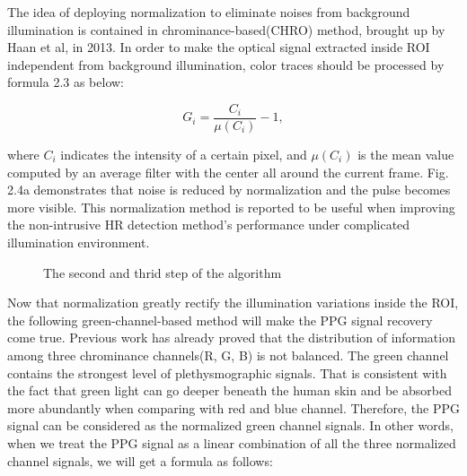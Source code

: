 The idea of deploying normalization to eliminate noises from background illumination is contained in chrominance-based(CHRO) method, brought up by Haan et al\cite{de2013robust}, in 2013. In order to make the optical signal extracted inside ROI independent from background illumination, color traces should be processed by formula 2.3 as below:


      \begin{equation}
        G_i = \frac{C_i}{\mu(C_i)}-1,
    \end{equation} 

where $C_i$ indicates the intensity of a certain pixel, and $\mu(C_i)$ is the mean value computed by an average filter with the center all around the current frame. Fig. 2.4a demonstrates that noise is reduced by normalization and the pulse becomes more visible. This normalization method is reported to be useful when improving the non-intrusive HR detection method's performance under complicated illumination environment\cite{de2013robust}. 

\begin{figure}[ht]
\hspace{-0.5in}
\caption{The second and thrid step of the algorithm }\label{fig:noted-figure}
\end{figure}

Now that normalization greatly rectify the illumination variations inside the ROI, the following green-channel-based method will make the PPG signal recovery come true. Previous work has already proved that the distribution of information among three chrominance channels(R, G, B) is not balanced. The green channel contains the strongest level of plethysmographic signals\cite{verkruysse2008remote}. That is consistent with the fact that green light can go deeper beneath the human skin and be absorbed more abundantly when comparing with red and blue channel. Therefore, the PPG signal can be considered as the normalized green channel signals. In other words, when we treat the PPG signal as a linear combination of all the three normalized channel signals, we will get a formula as follows:


